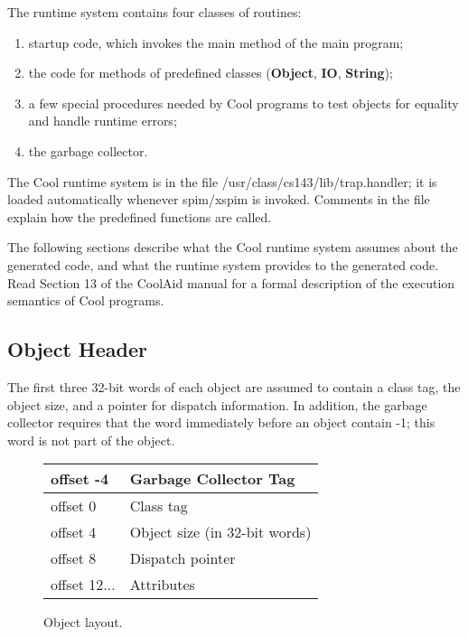 \documentclass[11pt]{article}
\def\U#1{{\sf{}#1}}
\def\C#1{{\bf{}#1}}
\begin{document}
The runtime system contains four classes of routines: 
\begin{enumerate}
\item startup code, which invokes the main method of the
main program;

\item the code for methods of predefined classes
(\C{Object}, \C{IO}, \C{String});

\item a few special procedures needed by Cool programs to test objects
	for equality and handle runtime errors;

\item the garbage collector.
\end{enumerate}

The Cool runtime system is in the file \U{/usr/class/cs143/lib/trap.handler};
it is loaded automatically whenever \U{spim}/\U{xspim} is invoked. 
Comments in the file explain how the predefined functions are called.

The following sections describe what the Cool runtime system assumes about
the generated code, and what the runtime system provides to the generated
code. Read Section 13 of the \U{CoolAid} manual for a formal description
of the execution semantics of Cool programs.

\subsection{Object Header}
The first three 32-bit words of each object are assumed to contain a
class tag, the object size, and a pointer for dispatch information.
In addition, the garbage collector requires that 
the word immediately before an object contain -1; this word is not part of the
object.

\begin{figure}
\begin{center}
\begin{tabular}{|l|l|}
\hline
offset -4 & Garbage Collector Tag\\
\hline
offset 0 & Class tag\\
\hline
offset 4 & Object size (in 32-bit words)\\
\hline
offset 8 & Dispatch pointer\\
\hline
offset 12$\ldots$ & Attributes \\
\hline
\end{tabular}
\end{center}
\caption{Object layout.}
\label{fig0}
\end{figure}
\end{document}

